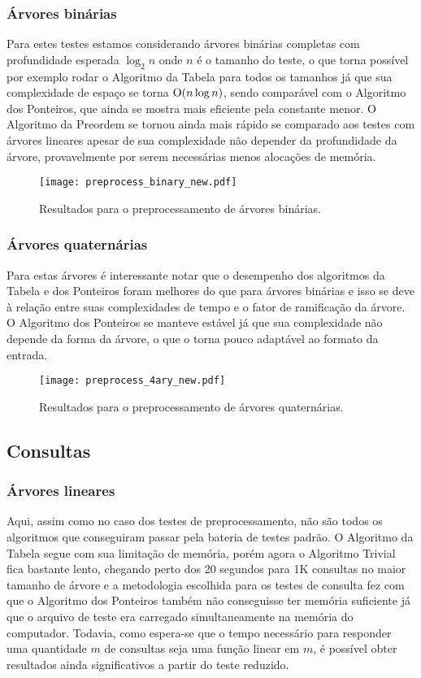 \newpage

\subsubsection{Árvores binárias}
Para estes testes estamos considerando árvores binárias completas com profundidade
esperada $\log_2 n$ onde $n$ é o tamanho do teste, o que torna possível por exemplo
rodar o Algoritmo da Tabela para todos os tamanhos já que sua complexidade de espaço
se torna $\mathrm{O}(n \log n)$, sendo comparável com o Algoritmo dos Ponteiros, que ainda
se mostra mais eficiente pela constante menor. O Algoritmo da Preordem se tornou ainda
mais rápido se comparado aos testes com árvores lineares apesar de sua complexidade não
depender da profundidade da árvore, provavelmente por serem necessárias menos alocações
de memória.

\begin{figure}
  \texttt{[image: preprocess\_binary\_new.pdf]}
  \caption{Resultados para o preprocessamento de árvores binárias.}
\end{figure}

\subsubsection{Árvores quaternárias}
Para estas árvores é interessante notar que o desempenho dos algoritmos da Tabela e dos
Ponteiros foram melhores do que para árvores binárias e isso se deve à relação entre
suas complexidades de tempo e o fator de ramificação da árvore. O Algoritmo dos Ponteiros
se manteve estável já que sua complexidade não depende da forma da árvore, o que o
torna pouco adaptável ao formato da entrada.

\begin{figure}[H]
  \texttt{[image: preprocess\_4ary\_new.pdf]}
  \caption{Resultados para o preprocessamento de árvores quaternárias.}
\end{figure}

\subsection{Consultas}

\subsubsection{Árvores lineares}
Aqui, assim como no caso dos testes de preprocessamento, não são todos os algoritmos
que conseguiram passar pela bateria de testes padrão. O Algoritmo da Tabela segue com
sua limitação de memória, porém agora o Algoritmo Trivial fica bastante lento, chegando
perto dos 20 segundos para 1K consultas no maior tamanho de árvore e a
metodologia escolhida para os testes de consulta fez com que o Algoritmo dos Ponteiros
também não conseguisse ter memória suficiente já que o arquivo de teste era carregado
simultaneamente na memória do computador. Todavia, como espera-se que o tempo necessário
para responder uma quantidade $m$ de consultas seja uma função linear em $m$, é possível
obter resultados ainda significativos a partir do teste reduzido.

